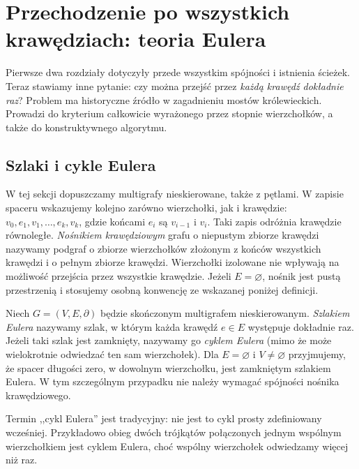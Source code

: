 
\chapter{Przechodzenie po wszystkich krawędziach: teoria Eulera}
\label{ch:tg-euler}

Pierwsze dwa rozdziały dotyczyły przede wszystkim spójności i istnienia
ścieżek. Teraz stawiamy inne pytanie: czy można przejść przez \emph{każdą
krawędź dokładnie raz}? Problem ma historyczne źródło w zagadnieniu
mostów królewieckich. Prowadzi do kryterium całkowicie wyrażonego
przez stopnie wierzchołków, a także do konstruktywnego algorytmu.

\section{Szlaki i cykle Eulera}
\label{sec:tg-euler-def}

W tej sekcji dopuszczamy multigrafy nieskierowane, także z pętlami.
W zapisie spaceru wskazujemy kolejno zarówno wierzchołki, jak i
krawędzie: $v_0,e_1,v_1,\ldots,e_k,v_k$, gdzie końcami $e_i$ są
$v_{i-1}$ i $v_i$. Taki zapis odróżnia krawędzie równoległe.
\emph{Nośnikiem krawędziowym} grafu o niepustym zbiorze
krawędzi nazywamy podgraf o zbiorze wierzchołków złożonym
z końców wszystkich krawędzi i o pełnym zbiorze krawędzi.
Wierzchołki izolowane nie wpływają na możliwość przejścia
przez wszystkie krawędzie. Jeżeli $E=\varnothing$, nośnik
jest pustą przestrzenią i stosujemy osobną konwencję
ze wskazanej poniżej definicji.

\begin{definicja}
Niech $G=(V,E,\partial)$ będzie skończonym multigrafem nieskierowanym.
\emph{Szlakiem Eulera} nazywamy szlak, w którym każda krawędź
$e\in E$ występuje dokładnie raz. Jeżeli taki szlak jest zamknięty,
nazywamy go \emph{cyklem Eulera} (mimo że może wielokrotnie
odwiedzać ten sam wierzchołek). Dla $E=\varnothing$ i $V\ne\varnothing$ przyjmujemy,
że spacer długości zero, w dowolnym wierzchołku,
jest zamkniętym szlakiem Eulera. W tym szczególnym przypadku
nie należy wymagać spójności nośnika krawędziowego.
\end{definicja}

Termin ,,cykl Eulera'' jest tradycyjny: nie jest to cykl prosty
zdefiniowany wcześniej. Przykładowo obieg dwóch trójkątów
połączonych jednym wspólnym wierzchołkiem jest cyklem Eulera,
choć wspólny wierzchołek odwiedzamy więcej niż raz.

